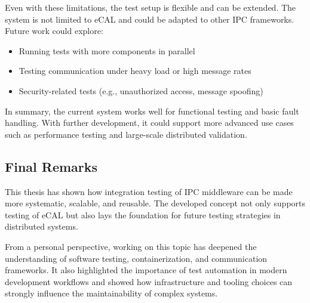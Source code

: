 \vspace{1em}
Even with these limitations, the test setup is flexible and can be extended. The system is not limited to eCAL and could be adapted to other IPC frameworks. Future work could explore:

\begin{itemize}
	\item Running tests with more components in parallel
	\item Testing communication under heavy load or high message rates
	\item Security-related tests (e.g., unauthorized access, message spoofing)
\end{itemize}

\vspace{1em}
In summary, the current system works well for functional testing and basic fault handling. With further development, it could support more advanced use cases such as performance testing and large-scale distributed validation.


\vspace{1em}
\subsection*{Final Remarks}

\vspace{1em}
This thesis has shown how integration testing of IPC middleware can be made more systematic, scalable, and reusable. The developed concept not only supports testing of eCAL but also lays the foundation for future testing strategies in distributed systems.

\vspace{1em}
From a personal perspective, working on this topic has deepened the understanding of software testing, containerization, and communication frameworks. It also highlighted the importance of test automation in modern development workflows and showed how infrastructure and tooling choices can strongly influence the maintainability of complex systems.

\clearpage

